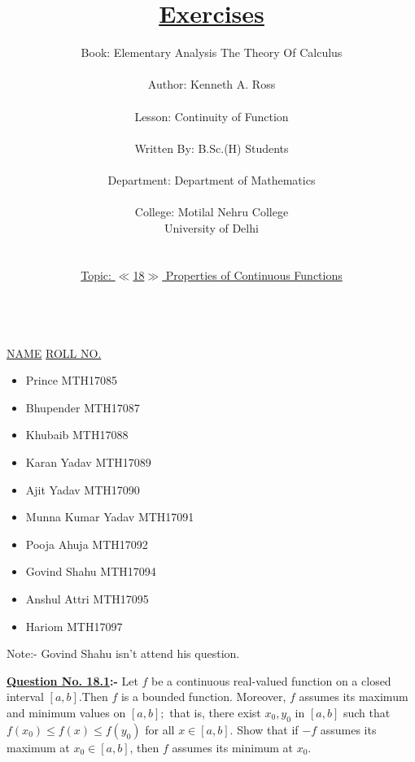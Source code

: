\documentclass[12pt]{article}
\date{}
\title{\underline{Exercises}}
\author{Book: \hspace{.1cm}Elementary Analysis The Theory Of Calculus\\\\Author: Kenneth A. Ross \\\\Lesson: Continuity of Function \\\\ Written By: B.Sc.(H) Students \\\\ Department: Department of Mathematics \\\\ College:  Motilal Nehru College\\ \hspace{2cm}University of Delhi\\\\\\ \underline{Topic: $\ll$18$\gg$ Properties of Continuous Functions}}
\begin{document}
\\

\vspace{1cm}
\underline{NAME} \hspace{3cm}  \hspace{6cm} \underline{ ROLL NO.}

\begin{itemize}
	\item Prince              \hspace{10cm}    MTH17085
	\item Bhupender           \hspace{9.3cm}   MTH17087
	\item Khubaib             \hspace{9.7cm}   MTH17088
	\item Karan Yadav         \hspace{9.cm}   MTH17089
	\item Ajit Yadav          \hspace{9.4cm}   MTH17090
	\item Munna Kumar Yadav   \hspace{7.5cm}   MTH17091
	\item Pooja Ahuja         \hspace{9.2cm}   MTH17092
	\item Govind Shahu        \hspace{9.cm}    MTH17094 
	\item Anshul Attri        \hspace{9.2cm}   MTH17095
	\item Hariom              \hspace{10.2cm}   MTH17097
	
	\end{itemize}
	\vspace{1cm}
\begin{mdframed}[style=MyFrame]
Note:- Govind Shahu isn't attend his question.
\end{mdframed}
\pagebreak

\begin{mdframed}[style=MyFrame]
\textbf{\underline{Question No. 18.1}:-} Let $f$ be a continuous real-valued function on a closed interval $[a, b]$.Then $f$ is a bounded function. Moreover, $f$ assumes its maximum and minimum values on $[a, b];$ that is, there exist $x_{0}, y_{0}$ in $[a, b]$ such that $f(x_{0}) \leq f(x) \leq f(y_{0})$ for all $x \in [a, b]$. Show that if $−f $ assumes its maximum at $x_{0} \in [a, b]$, then $f$ assumes its minimum at $x_{0}$.\\
\end{mdframed}
\vspace*{1cm}
\end{document}
